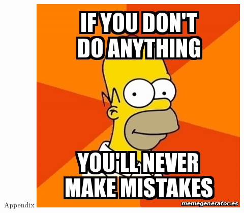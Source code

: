 \documentclass[rgb]{beamer}
\begin{document}
\appendix
\begin{frame}{Appendix}
    \centering
    \includegraphics[height=0.85\textheight,width=\textwidth,keepaspectratio]{img/homer.jpg}
\end{frame}
\end{document}
